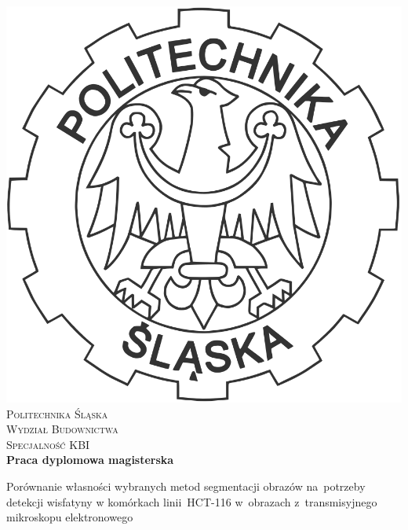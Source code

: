 
\newpage
\thispagestyle{empty}





\begin{onehalfspacing}
\begin{center}

\centering
\includegraphics[keepaspectratio,scale=0.1]{./figures/godlo.PNG} \\[.8cm]


{\fontsize{17}{17}\selectfont
\textsc{Politechnika Śląska \\[.3cm]
Wydział Budownictwa \\[.3cm]
Specjalność KBI \\[2.5cm]}
\textbf{Praca dyplomowa magisterska \\[1.7cm]}}



\large 
{Porównanie własności wybranych metod segmentacji obrazów na~potrzeby detekcji wisfatyny w komórkach linii~HCT-116 w~obrazach z~transmisyjnego mikroskopu elektronowego} \\[2.3cm]



\end{center}
\end{onehalfspacing}
